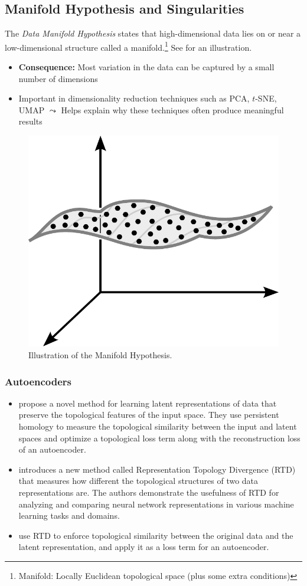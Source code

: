 \documentclass[11pt, a4paper]{amsart}
\begin{document}
\subsection{Manifold Hypothesis and Singularities}

The \emph{Data Manifold Hypothesis} states that high-dimensional data lies on or near a low-dimensional structure called a manifold.\footnote{Manifold: Locally Euclidean topological space (plus some extra conditions)}
See  for an illustration.

\begin{itemize}
	\item \textbf{Consequence:} Most variation in the data can be captured by a small number of dimensions
	\item Important in dimensionality reduction techniques such as PCA, $t$-SNE, UMAP
	\newline
	$\leadsto$ Helps explain why these techniques often produce meaningful results
\end{itemize}

\begin{figure}
	\centering
	\includegraphics[width=0.4\linewidth]{figures/topological_data_analysis/manifold_hypothesis.pdf}
	\caption{
		Illustration of the Manifold Hypothesis.
		\label{fig:manifold_hypothesis}
	}
\end{figure}


\subsubsection{Autoencoders}

\begin{itemize}
	\item \cite{moor2021topological} propose a novel method for learning latent representations of data that preserve the topological features of the input space.
	They use persistent homology to measure the topological similarity between the input and latent spaces and optimize a topological loss term along with the reconstruction loss of an autoencoder.
	\item \cite{barannikov2022representation} introduces a new method called Representation Topology Divergence (RTD) that measures how different the topological structures of two data representations are. 
	The authors demonstrate the usefulness of RTD for analyzing and comparing neural network representations in various machine learning tasks and domains.
	\item \cite{trofimov2023learning} use RTD to enforce topological similarity between the original data and the latent representation, and apply it as a loss term for an autoencoder.
\end{itemize}
\end{document}
